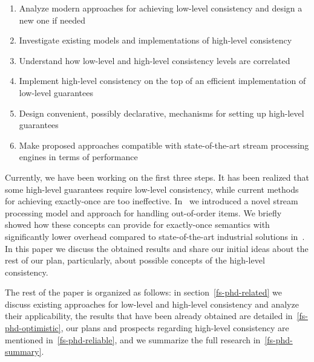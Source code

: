 \begin{enumerate}
    \item Analyze modern approaches for achieving low-level consistency and design a new one if needed
    \item Investigate existing models and implementations of high-level consistency
    \item Understand how low-level and high-level consistency levels are correlated
    \item Implement high-level consistency on the top of an efficient implementation of low-level guarantees
    \item Design convenient, possibly declarative, mechanisms for setting up high-level guarantees
    \item Make proposed approaches compatible with state-of-the-art stream processing engines in terms of performance
\end{enumerate}

Currently, we have been working on the first three steps. It has been realized that some high-level guarantees require low-level consistency, while current methods for achieving exactly-once are too ineffective. In~\cite{we2018seim} we introduced a novel stream processing model and approach for handling out-of-order items. We briefly showed how these concepts can provide for exactly-once semantics with significantly lower overhead compared to state-of-the-art industrial solutions in~\cite{we2018beyondmr}. In this paper we discuss the obtained results and share our initial ideas about the rest of our plan, particularly, about possible concepts of the high-level consistency. 

The rest of the paper is organized as follows: in section~\ref{fs-phd-related} we discuss existing approaches for low-level and high-level consistency and analyze their applicability, the results that have been already obtained are detailed in~\ref{fs-phd-optimistic}, our plans and prospects regarding high-level consistency are mentioned in~\ref{fs-phd-reliable}, and we summarize the full research in~\ref{fs-phd-summary}.

